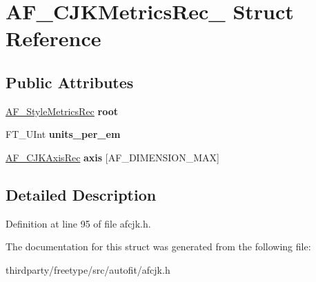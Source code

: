 \hypertarget{struct_a_f___c_j_k_metrics_rec__}{}\section{A\+F\+\_\+\+C\+J\+K\+Metrics\+Rec\+\_\+ Struct Reference}
\label{struct_a_f___c_j_k_metrics_rec__}
\subsection*{Public Attributes}
\begin{DoxyCompactItemize}
\item 
\mbox{\label{struct_a_f___c_j_k_metrics_rec___af67b3e8149149dfcb8cb8a328ba17642}} 
\hyperlink{struct_a_f___style_metrics_rec__}{A\+F\+\_\+\+Style\+Metrics\+Rec} {\bfseries root}
\item 
\mbox{\label{struct_a_f___c_j_k_metrics_rec___a447028a1e2b3e58a884acb29cbc80711}} 
F\+T\+\_\+\+U\+Int {\bfseries units\+\_\+per\+\_\+em}
\item 
\mbox{\label{struct_a_f___c_j_k_metrics_rec___aaa41d4ab74cb91cb6c4e5ae6bf471651}} 
\hyperlink{struct_a_f___c_j_k_axis_rec__}{A\+F\+\_\+\+C\+J\+K\+Axis\+Rec} {\bfseries axis} \mbox{[}A\+F\+\_\+\+D\+I\+M\+E\+N\+S\+I\+O\+N\+\_\+\+M\+AX\mbox{]}
\end{DoxyCompactItemize}


\subsection{Detailed Description}


Definition at line 95 of file afcjk.\+h.



The documentation for this struct was generated from the following file\+:\begin{DoxyCompactItemize}
\item 
thirdparty/freetype/src/autofit/afcjk.\+h\end{DoxyCompactItemize}
